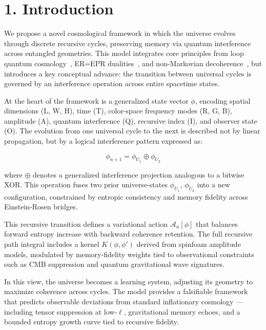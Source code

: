 \section*{1. Introduction}

We propose a novel cosmological framework in which the universe evolves through discrete recursive cycles, preserving memory via quantum interference across entangled geometries. This model integrates core principles from loop quantum cosmology~\cite{ashtekar2006quantum}, ER=EPR dualities~\cite{maldacena2013cool}, and non-Markovian decoherence~\cite{breuer2002theory}, but introduces a key conceptual advance: the transition between universal cycles is governed by an interference operation across entire spacetime states.

At the heart of the framework is a generalized state vector \( \phi \), encoding spatial dimensions (L, W, H), time (T), color-space frequency modes (R, G, B), amplitude (A), quantum interference (Q), recursive index (I), and observer state (O). The evolution from one universal cycle to the next is described not by linear propagation, but by a logical interference pattern expressed as:

\[
\phi_{n+1} = \phi_{U_1} \oplus \phi_{U_2}
\]

where \( \oplus \) denotes a generalized interference projection analogous to a bitwise XOR. This operation fuses two prior universe-states \( \phi_{U_1} \), \( \phi_{U_2} \) into a new configuration, constrained by entropic consistency and memory fidelity across Einstein-Rosen bridges.

This recursive transition defines a variational action \( \mathcal{A}_n[\phi] \) that balances forward entropy increase with backward coherence retention. The full recursive path integral includes a kernel \( K(\phi, \phi') \) derived from spinfoam amplitude models, modulated by memory-fidelity weights tied to observational constraints such as CMB suppression and quantum gravitational wave signatures.

In this view, the universe becomes a learning system, adjusting its geometry to maximize coherence across cycles. The model provides a falsifiable framework that predicts observable deviations from standard inflationary cosmology — including tensor suppression at low-\( \ell \), gravitational memory echoes, and a bounded entropy growth curve tied to recursive fidelity.

